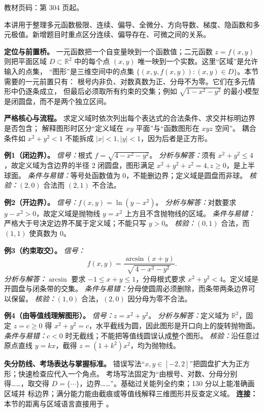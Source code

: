 
\begin{knowledgeBox}
教材页码：第 304 页起。

本讲用于整理多元函数极限、连续、偏导、全微分、方向导数、梯度、隐函数和多元极值。新增题目时重点区分连续、偏导存在、可微之间的关系。
\end{knowledgeBox}


\begin{knowledgeBox}
\textbf{定位与前置桥。}
一元函数把一个自变量映到一个函数值；二元函数
\(z=f(x,y)\) 则把平面区域 \(D\subset\mathbb R^2\) 中的每个点
\((x,y)\) 唯一映到一个实数。这里“区域”是允许输入的点集，
“图形”是三维空间中的点集
\(\{(x,y,f(x,y)):(x,y)\in D\}\)。本节需要的一元前置只有：
根号内非负、对数真数为正、分母不为零。它们在多元情形中仍逐条成立，
但最后必须取所有约束的交集；例如
\(\sqrt{1-x^2-y^2}\) 的最小模型是闭圆盘，而不是两个独立区间。

\textbf{严格核心与流程。}
求定义域时依次列出每个表达式的合法条件、求交并标明边界是否包含；
解释图形时区分“定义域在 \(xy\) 平面”与“函数图形在 \(xyz\) 空间”。
耦合条件如 \(x^2+y^2<1\) 不能拆成 \(|x|<1,|y|<1\)，因为后者是正方形。

\textbf{例1（闭边界）。}
\emph{信号：}根式 \(f=\sqrt{4-x^2-y^2}\)。
\emph{分析与解答：}须有 \(x^2+y^2\le4\)，故定义域为含边界的半径 \(2\)
闭圆盘，图形满足 \(x^2+y^2+z^2=4,z\ge0\)，是上半球面。
\emph{条件与易错：}等号处函数值为 \(0\)，不能删边界；定义域是圆盘而非球。
\emph{核验：}\((2,0)\) 合法而 \((2,1)\) 不合法。

\textbf{例2（开边界）。}
\emph{信号：}\(f(x,y)=\ln(y-x^2)\)。
\emph{分析与解答：}对数要求 \(y-x^2>0\)，故定义域是抛物线
\(y=x^2\) 上方且不含抛物线的区域。
\emph{条件与易错：}严格大于号决定边界不属于定义域；不能只写 \(y>0\)。
\emph{核验：}\((0,1)\) 合法，而 \((1,1)\) 使真数为 \(0\)。

\textbf{例3（约束取交）。}
\emph{信号：}
\[
f(x,y)=\frac{\arcsin(x+y)}{\sqrt{\,4-x^2-y^2\,}}.
\]
\emph{分析与解答：}\(\arcsin\) 要求 \(-1\le x+y\le1\)，分母根式要求
\(x^2+y^2<4\)。定义域是开圆盘与闭条带的交集。
\emph{条件与易错：}分母使圆周必须删除，而条带两条边界可以保留。
\emph{核验：}\((1,0)\) 合法，\((2,0)\) 因分母为零不合法。

\textbf{例4（由等值线理解图形）。}
\emph{信号：}\(z=x^2+y^2\)。
\emph{分析与解答：}定义域为 \(\mathbb R^2\)，固定 \(z=c\ge0\) 得
\(x^2+y^2=c\)，水平截线为圆，因此图形是开口向上的旋转抛物面。
\emph{条件与易错：}\(c<0\) 时无截线；不能把等值线圆误认成整个图形。
\emph{核验：}沿任意过原点直线 \(y=kx\)，截得 \(z=(1+k^2)x^2\)，均为抛物线。

\textbf{失分防线、考场表达与掌握标准。}
错误写法“\(x,y\in[-2,2]\)”把圆盘扩大为正方形；快速检查应代入一个角点。
考场写法固定为“由根号、对数、分母分别得……，取交得
\(D=\{\cdots\}\)，边界……”。基础过关能列全约束；130 分以上能准确画区域并
标边界；满分能力能由截痕或等值线解释三维图形并反查定义域。
\textbf{连接：}本节的距离与区域语言直接用于
。
\end{knowledgeBox}

